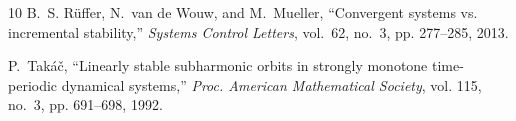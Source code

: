 \documentclass[onecolumn]{IEEEtran}
\begin{document}
\begin{thebibliography}{10}
B.~S. Rüffer, N.~{van de Wouw}, and M.~Mueller, ``Convergent systems vs. incremental stability,'' \emph{Systems Control Letters}, vol.~62, no.~3, pp. 277--285, 2013.

P.~Takáč, ``Linearly stable subharmonic orbits in strongly monotone time-periodic dynamical systems,'' \emph{Proc. American Mathematical Society}, vol. 115, no.~3, pp. 691--698, 1992.

\end{thebibliography}
\end{document}
